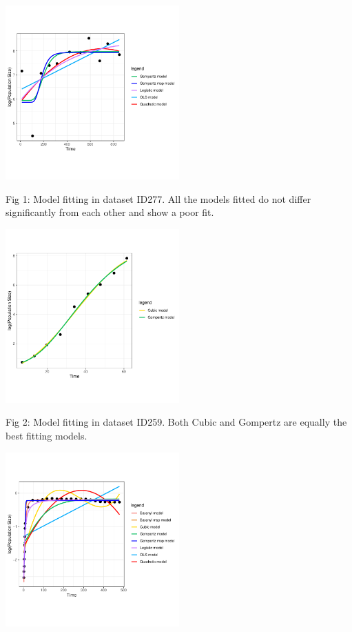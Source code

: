 \documentclass[11pt]{article}
\begin{document}
\vspace{\baselineskip}
\vspace{\baselineskip}
\vspace{\baselineskip}

\includegraphics[width=0.5\textwidth]{../results/ID277.pdf}


{\footnotesize Fig 1: Model fitting in dataset ID277. All the models fitted do not differ significantly from each other and show a poor fit. }

\vspace{\baselineskip}

\includegraphics[width=0.5\textwidth]{../results/ID259.pdf}


{\footnotesize Fig 2: Model fitting in dataset ID259. Both Cubic and Gompertz are equally the best fitting models.  }

\vspace{\baselineskip}

\includegraphics[width=0.5\textwidth]{../results/ID131.pdf}
\end{document}
